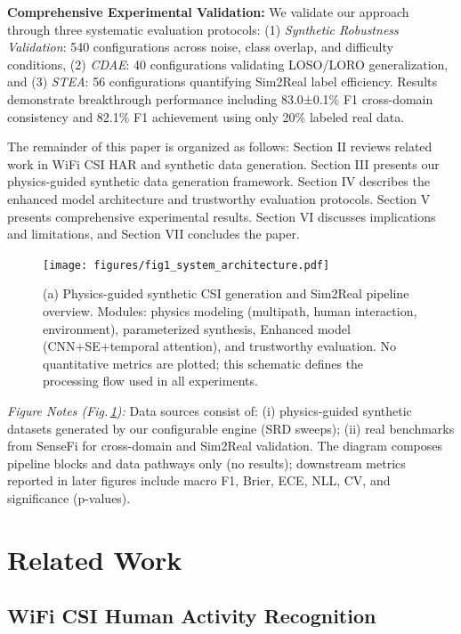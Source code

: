 \documentclass[journal]{IEEEtran}
\begin{document}
\textbf{Comprehensive Experimental Validation:} We validate our approach through three systematic evaluation protocols: (1) \textit{Synthetic Robustness Validation}: 540 configurations across noise, class overlap, and difficulty conditions, (2) \textit{CDAE}: 40 configurations validating LOSO/LORO generalization, and (3) \textit{STEA}: 56 configurations quantifying Sim2Real label efficiency. Results demonstrate breakthrough performance including 83.0±0.1\% F1 cross-domain consistency and 82.1\% F1 achievement using only 20\% labeled real data.

The remainder of this paper is organized as follows: Section II reviews related work in WiFi CSI HAR and synthetic data generation. Section III presents our physics-guided synthetic data generation framework. Section IV describes the enhanced model architecture and trustworthy evaluation protocols. Section V presents comprehensive experimental results. Section VI discusses implications and limitations, and Section VII concludes the paper.

\begin{figure}[t]
\centering
\texttt{[image: figures/fig1\_system\_architecture.pdf]}
\caption{(a) Physics-guided synthetic CSI generation and Sim2Real pipeline overview. Modules: physics modeling (multipath, human interaction, environment), parameterized synthesis, Enhanced model (CNN+SE+temporal attention), and trustworthy evaluation. No quantitative metrics are plotted; this schematic defines the processing flow used in all experiments.}
\label{fig:system_overview}
\end{figure}

\noindent\textit{Figure Notes (Fig.\,\ref{fig:system_overview}):} Data sources consist of: (i) physics-guided synthetic datasets generated by our configurable engine (SRD sweeps); (ii) real benchmarks from SenseFi for cross-domain and Sim2Real validation. The diagram composes pipeline blocks and data pathways only (no results); downstream metrics reported in later figures include macro F1, Brier, ECE, NLL, CV, and significance (p-values).


\section{Related Work}

\subsection{WiFi CSI Human Activity Recognition}
\end{document}
